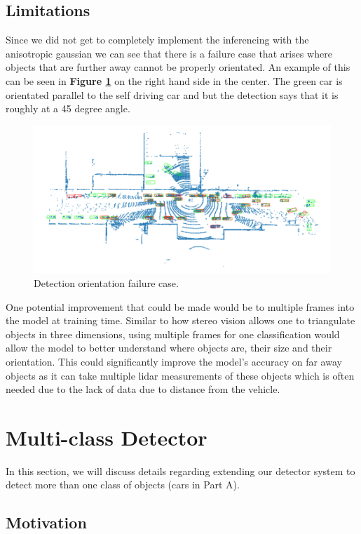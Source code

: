 \documentclass[letter]{article}
\newcommand{\fref}[1]{\textbf{Figure \ref{#1}}}
\begin{document}
	\subsection{Limitations}
	Since we did not get to completely implement the inferencing with the anisotropic gaussian we can see that there is a failure case that arises where objects that are further away cannot be properly orientated. An example of this can be seen in \fref{fig:failure} on the right hand side in the center. The green car is orientated parallel to the self driving car and but the detection says that it is roughly at a 45 degree angle.

	\begin{figure}[h]
		\centering
		\includegraphics[scale=0.35]{images/failure.png}
		\caption{Detection orientation failure case.}
		\label{fig:failure}
	\end{figure}
	
	One potential improvement that could be made would be to multiple frames into the model at training time. Similar to how stereo vision allows one to triangulate objects in three dimensions, using multiple frames for one classification would allow the model to better understand where objects are, their size and their orientation. This could significantly improve the model's accuracy on far away objects as it can take multiple lidar measurements of these objects which is often needed due to the lack of data due to distance from the vehicle.

	\section{Multi-class Detector}

    In this section, we will discuss details regarding extending our detector system to detect more than one class of objects (cars in Part A). 

	\subsection{Motivation}
\end{document}

